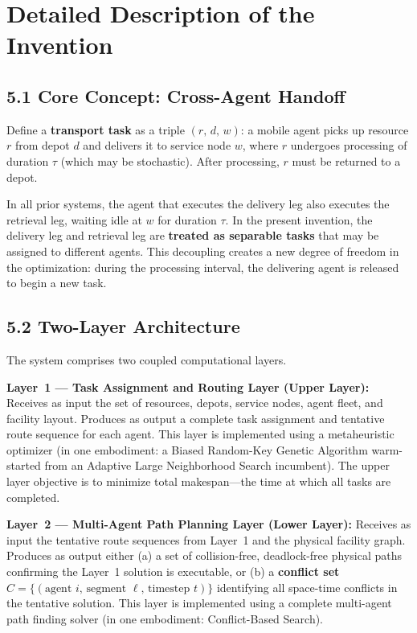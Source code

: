 \documentclass[12pt]{article}
\begin{document}
\section{Detailed Description of the Invention}

\subsection{5.1 \quad Core Concept: Cross-Agent Handoff}

Define a \textbf{transport task} as a triple $(r,\, d,\, w)$: a mobile agent picks up resource $r$ from depot $d$ and delivers it to service node $w$, where $r$ undergoes processing of duration $\tau$ (which may be stochastic). After processing, $r$ must be returned to a depot.

In all prior systems, the agent that executes the delivery leg also executes the retrieval leg, waiting idle at $w$ for duration $\tau$. In the present invention, the delivery leg and retrieval leg are \textbf{treated as separable tasks} that may be assigned to different agents. This decoupling creates a new degree of freedom in the optimization: during the processing interval, the delivering agent is released to begin a new task.

\subsection{5.2 \quad Two-Layer Architecture}

The system comprises two coupled computational layers.

\medskip
\noindent\textbf{Layer~1 --- Task Assignment and Routing Layer (Upper Layer):}
Receives as input the set of resources, depots, service nodes, agent fleet, and facility layout. Produces as output a complete task assignment and tentative route sequence for each agent. This layer is implemented using a metaheuristic optimizer (in one embodiment: a Biased Random-Key Genetic Algorithm warm-started from an Adaptive Large Neighborhood Search incumbent). The upper layer objective is to minimize total makespan---the time at which all tasks are completed.

\medskip
\noindent\textbf{Layer~2 --- Multi-Agent Path Planning Layer (Lower Layer):}
Receives as input the tentative route sequences from Layer~1 and the physical facility graph. Produces as output either (a) a set of collision-free, deadlock-free physical paths confirming the Layer~1 solution is executable, or (b) a \textbf{conflict set} $C = \{(\text{agent } i,\, \text{segment } \ell,\, \text{timestep } t)\}$ identifying all space-time conflicts in the tentative solution. This layer is implemented using a complete multi-agent path finding solver (in one embodiment: Conflict-Based Search).
\end{document}
